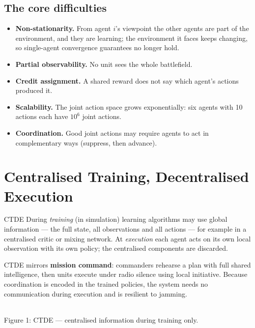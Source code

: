 \documentclass[11pt]{article}
\begin{document}
\subsection{The core difficulties}
\begin{itemize}
\item \textbf{Non-stationarity.} From agent $i$'s viewpoint the other agents are part of the environment, and they are learning; the environment it faces keeps changing, so single-agent convergence guarantees no longer hold.
\item \textbf{Partial observability.} No unit sees the whole battlefield.
\item \textbf{Credit assignment.} A shared reward does not say which agent's actions produced it.
\item \textbf{Scalability.} The joint action space grows exponentially: six agents with 10 actions each have $10^6$ joint actions.
\item \textbf{Coordination.} Good joint actions may require agents to act in complementary ways (suppress, then advance).
\end{itemize}

\section{Centralised Training, Decentralised Execution}
\begin{definition}{CTDE}
During \emph{training} (in simulation) learning algorithms may use global information --- the full state, all observations and all actions --- for example in a centralised critic or mixing network. At \emph{execution} each agent acts on its own local observation with its own policy; the centralised components are discarded.
\end{definition}
CTDE mirrors \textbf{mission command}: commanders rehearse a plan with full shared intelligence, then units execute under radio silence using local initiative. Because coordination is encoded in the trained policies, the system needs no communication during execution and is resilient to jamming.
\begin{center}\\{\small\color{GreyN}Figure 1: CTDE --- centralised information during training only.}\end{center}
\end{document}
